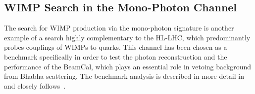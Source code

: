 \subsection{WIMP Search in the Mono-Photon Channel}

The search for WIMP production via the mono-photon signature is another example of a search highly complementary to the HL-LHC, which predominantly probes couplings of WIMPs to quarks. This channel has been chosen as a  benchmark specifically in order to test the photon reconstruction and the performance of the BeamCal, which plays an essential role in vetoing background from Bhabha scattering. The benchmark analysis is described in more detail in~\cite{ILDNote:WIMPs} and closely follows~\cite{Habermehl:2018yul}.
